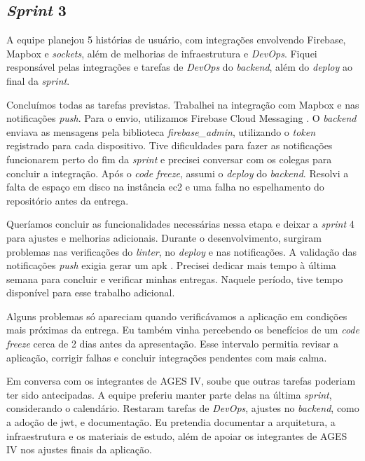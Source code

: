 \subsection{\textit{Sprint} 3}

A equipe planejou 5 histórias de usuário, com integrações envolvendo Firebase,
Mapbox e \textit{sockets}, além de melhorias de infraestrutura e
\textit{DevOps}. Fiquei responsável pelas integrações e tarefas de
\textit{DevOps} do \textit{backend}, além do \textit{deploy} ao final da
\textit{sprint}.

Concluímos todas as tarefas previstas. Trabalhei na integração com Mapbox
\cite{mapbox-docs} e nas notificações \textit{push}. Para o envio, utilizamos
Firebase Cloud Messaging \cite{firebase-cloud-messaging}. O \textit{backend} enviava as
mensagens pela biblioteca \textit{firebase\_admin}, utilizando o
\textit{token} registrado para cada dispositivo. Tive dificuldades para
fazer as notificações funcionarem perto do fim da \textit{sprint} e precisei
conversar com os colegas para concluir a integração. Após o
\textit{code freeze}, assumi o \textit{deploy} do \textit{backend}. Resolvi
a falta de espaço em disco na instância \ac{ec2} e uma falha no espelhamento
do repositório antes da entrega.

Queríamos concluir as funcionalidades necessárias nessa etapa e deixar a
\textit{sprint} 4 para ajustes e melhorias adicionais. Durante o
desenvolvimento, surgiram problemas nas verificações do \textit{linter}, no
\textit{deploy} e nas notificações. A validação das notificações
\textit{push} exigia gerar um \ac{apk} \cite{android-apk-docs}. Precisei dedicar mais tempo à última semana
para concluir e verificar minhas entregas. Naquele período, tive
tempo disponível para esse trabalho adicional.

Alguns problemas só apareciam quando verificávamos a aplicação em condições
mais próximas da entrega. Eu também vinha percebendo os benefícios de um
\textit{code freeze} cerca de 2 dias antes da apresentação. Esse intervalo
permitia revisar a aplicação, corrigir falhas e concluir integrações pendentes
com mais calma.

Em conversa com os integrantes de AGES IV, soube que outras tarefas poderiam
ter sido antecipadas. A equipe preferiu manter parte delas na última
\textit{sprint}, considerando o calendário. Restaram tarefas de
\textit{DevOps}, ajustes no \textit{backend}, como a adoção de \ac{jwt}, e
documentação. Eu pretendia documentar a arquitetura, a infraestrutura e os
materiais de estudo, além de apoiar os integrantes de AGES IV nos ajustes
finais da aplicação.
